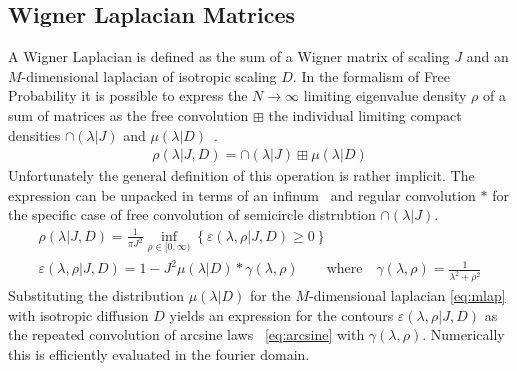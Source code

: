 \documentclass{article}[12pt]
\numberwithin{equation}{section}
\begin{document}
\subsection{Wigner Laplacian Matrices}
A Wigner Laplacian is defined as the sum of a Wigner matrix
of scaling $J$ and an $M$-dimensional laplacian of isotropic scaling $D$.
In the formalism of Free Probability it is possible to express the
$N\rightarrow\infty$ limiting eigenvalue density $\rho$ of a sum of
matrices as the free convolution $\boxplus$ the individual limiting
compact densities $\cap(\lambda|J)$ and $\mu(\lambda|D)$~\cite{Novak2012}.
\begin{align}
  \rho(\lambda|J,D)=\cap(\lambda|J)\boxplus\mu(\lambda|D)
  \label{eq:freeconv}
\end{align}
Unfortunately the general definition of this operation is rather implicit.
The expression can be unpacked in terms of an infinum~\cite{Biane_1997}
and regular convolution $*$ for the specific case of free convolution of
semicircle distrubtion $\cap(\lambda|J)$.
\begin{align}
  \rho(\lambda|J,D)=
  \frac{1}{\pi J^2}
  \inf_{\rho\in[0,\infty)}
  \left\{
  \varepsilon(\lambda,\rho|J,D)
  \geq0
  \right\}\qquad\qquad\quad\\
  \varepsilon(\lambda,\rho|J,D)=
  1-J^2\mu(\lambda|D)*\gamma(\lambda,\rho)
  \qquad\text{where}\quad\gamma(\lambda,\rho)=\frac{1}{\lambda^2+\rho^2}
  \label{eq:inf}
\end{align}
Substituting the distribution $\mu(\lambda|D)$ for the $M$-dimensional laplacian
\eqref{eq:mlap} with isotropic diffusion $D$ yields an expression for the contours
$\varepsilon(\lambda,\rho|J,D)$ as the repeated convolution of arcsine laws
~\eqref{eq:arcsine} with $\gamma(\lambda,\rho)$. Numerically this is efficiently
evaluated in the fourier domain.
\end{document}
